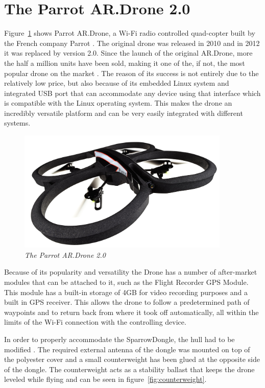 \section{The Parrot AR.Drone 2.0}

Figure~\ref{fig:drone} shows Parrot AR.Drone, a Wi-Fi radio controlled quad-copter built by the French company Parrot\cite{parrot2012drone} .
The original drone was released in 2010 and in 2012 it was replaced by version 2.0. Since the launch of the original AR.Drone, more the half a million units have been sold, making it one of the, if not, the most popular drone on the market \cite{parrotpopular}. The reason of its success is not entirely due to the relatively low price, but also because of its embedded Linux system and integrated USB port that can accommodate any device using that interface which is compatible with the Linux operating system. This makes the drone an incredibly versatile platform and can be very easily integrated with different systems. 
\begin{figure}[ht]
  \label{fig:drone}
\begin{center}
\includegraphics[width=0.9\textwidth]{img/drone.jpg}
\end{center}
\caption{\small \itshape{The Parrot AR.Drone 2.0}\cite{parrot_drone}}
\end{figure}


Because of its popularity and versatility the Drone has a number of after-market modules that can be attached to it, such as 
the Flight Recorder GPS Module. This module has a built-in storage of 4GB for video recording purposes and a built in GPS receiver. This allows the drone to follow a predetermined path of waypoints and to return back from where it took off automatically, all within the limits of the Wi-Fi connection with the controlling device.

In order to properly accommodate the SparrowDongle, the hull had to be modified . The required external antenna of the dongle was mounted on top of the polyester cover and a small counterweight has been glued at the opposite side of the dongle. The counterweight acts as a stability ballast that keeps the drone leveled while flying and can be seen in figure~\ref{fig:counterweight}.


